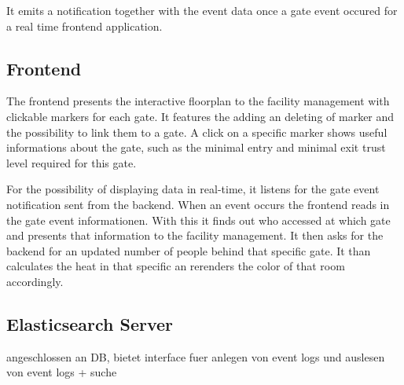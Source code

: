 It emits a notification together with the event data once a gate event occured for a real time frontend application.


\subsection{Frontend}
\label{Frontend}

The frontend presents the interactive floorplan to the facility management with clickable markers for each gate.
It features the adding an deleting of marker and the possibility to link them to a gate.
A click on a specific marker shows useful informations about the gate, such as the minimal entry and minimal exit trust level required for this gate.

For the possibility of displaying data in real-time, it listens for the gate event notification sent from the backend. When an event occurs the frontend reads in the gate event informationen. With this it finds out who accessed at which gate and presents that information to the facility management. It then asks for the backend for an updated number of people behind that specific gate. It than calculates the heat in that specific an rerenders the color of that room accordingly.

\subsection{Elasticsearch Server}
\label{Elasticsearch Server}

angeschlossen an DB, bietet interface fuer anlegen von event logs und auslesen von event logs + suche





